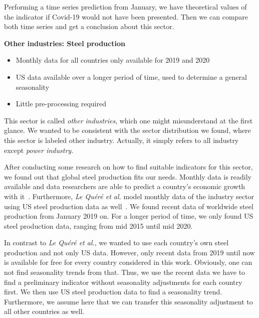 Performing a time series prediction from January, we have theoretical values of the indicator if Covid-19 would not have been presented. Then we can compare both time series and get a conclusion about this sector.




\vspace{1em}
\textbf{Other industries: Steel production}
\begin{itemize}
	\item Monthly data for all countries only available for 2019 and 2020
	\item US data available over a longer period of time, used to determine a general seasonality
	\item Little pre-processing required
\end{itemize}
This sector is called \textit{other industries}, which one might misunderstand at the first glance. We wanted to be consistent with the sector distribution we found, where this sector is labeled other industry. Actually, it simply refers to all industry except \textit{power industry}.

After conducting some research on how to find suitable indicators for this sector, we found out that global steel production fits our needs. Monthly data is readily available and data researchers are able to predict a country's economic growth with it~\cite{Ravazzolo2020}.
Furthermore, \textit{Le Quéré et al.} model monthly \co data of the industry sector using US steel production data as well~\cite{LeQuere2020}.
We found recent data of worldwide steel production from January 2019 on.
For a longer period of time, we only found US steel production data,  ranging from mid 2015 until mid 2020.

In contrast to \textit{Le Quéré et al.}, we wanted to use each country's own steel production and not only US data. However, only recent data from 2019 until now is available for free for every country considered in this work. Obviously, one can not find seasonality trends from that. Thus, we use the recent data we have to find a preliminary indicator without seasonality adjustments for each country first. We then use US steel production data to find a seasonality trend. Furthermore, we assume here that we can transfer this seasonality adjustment to all other countries as well.


